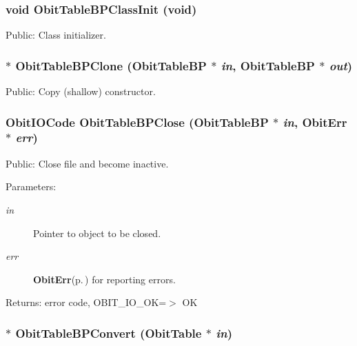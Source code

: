\subsubsection{\setlength{\rightskip}{0pt plus 5cm}void Obit\-Table\-BPClass\-Init (void)}\label{ObitTableBP_8h_a10}


Public: Class initializer. 

\subsubsection{$\ast$ Obit\-Table\-BPClone ({\bf Obit\-Table\-BP} $\ast$ {\em in}, {\bf Obit\-Table\-BP} $\ast$ {\em out})}\label{ObitTableBP_8h_a15}


Public: Copy (shallow) constructor. 

\subsubsection{\setlength{\rightskip}{0pt plus 5cm}Obit\-IOCode Obit\-Table\-BPClose ({\bf Obit\-Table\-BP} $\ast$ {\em in}, {\bf Obit\-Err} $\ast$ {\em err})}\label{ObitTableBP_8h_a21}


Public: Close file and become inactive. 

\begin{Desc}
\item[Parameters:]
\begin{description}
\item[{\em in}]Pointer to object to be closed. \item[{\em err}]{\bf Obit\-Err}{\rm (p.\,\pageref{structObitErr})} for reporting errors. \end{description}
\end{Desc}
\begin{Desc}
\item[Returns:]error code, OBIT\_\-IO\_\-OK=$>$ OK \end{Desc}
\subsubsection{$\ast$ Obit\-Table\-BPConvert ({\bf Obit\-Table} $\ast$ {\em in})}\label{ObitTableBP_8h_a16}


